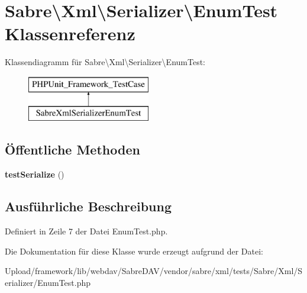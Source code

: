 \hypertarget{class_sabre_1_1_xml_1_1_serializer_1_1_enum_test}{}\section{Sabre\textbackslash{}Xml\textbackslash{}Serializer\textbackslash{}Enum\+Test Klassenreferenz}
\label{class_sabre_1_1_xml_1_1_serializer_1_1_enum_test}
Klassendiagramm für Sabre\textbackslash{}Xml\textbackslash{}Serializer\textbackslash{}Enum\+Test\+:\begin{figure}[H]
\begin{center}
\leavevmode
\includegraphics[height=2.000000cm]{class_sabre_1_1_xml_1_1_serializer_1_1_enum_test}
\end{center}
\end{figure}
\subsection*{Öffentliche Methoden}
\begin{DoxyCompactItemize}
\item 
\mbox{\label{class_sabre_1_1_xml_1_1_serializer_1_1_enum_test_ab5d80c6acc4c4c133cbe3c5228dee2a3}} 
{\bfseries test\+Serialize} ()
\end{DoxyCompactItemize}


\subsection{Ausführliche Beschreibung}


Definiert in Zeile 7 der Datei Enum\+Test.\+php.



Die Dokumentation für diese Klasse wurde erzeugt aufgrund der Datei\+:\begin{DoxyCompactItemize}
\item 
Upload/framework/lib/webdav/\+Sabre\+D\+A\+V/vendor/sabre/xml/tests/\+Sabre/\+Xml/\+Serializer/Enum\+Test.\+php\end{DoxyCompactItemize}
